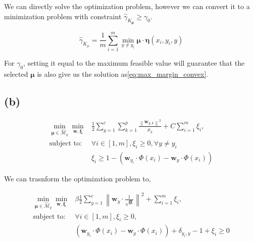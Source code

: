 \documentclass{article}
\begin{document}
We can directly solve the optimization problem, however we can convert it to a minimization problem with constraint $\widehat{\gamma}_{K_{\boldsymbol{\mu}}} \geq \gamma_{0}$.

\begin{equation}
    \widehat{\gamma}_{K_{\mu}}=\frac{1}{m} \sum_{i=1}^{m} \min _{y \neq y_{i}} \boldsymbol{\mu} \cdot \boldsymbol{\eta}\left(x_{i}, y_{i}, y\right)
\end{equation}

For $\gamma_0$, setting it equal to the maximum feasible value will guarantee that the selected $\bm{\mu}$ is also give us the solution as\eqref{eq:max_margin_convex}.

\subsection*{(b)}

\begin{equation}
    \begin{aligned}
        \min _{\boldsymbol{\mu} \in \widehat{\mathcal{M}}_{q}} \min _{\mathbf{w}, \boldsymbol{\xi}} & \frac{1}{2} \sum_{y=1}^{c} \sum_{k=1}^{p} \frac{\left\|\mathbf{w}_{y, k}\right\|^{2}}{\mu_{k}}+C \sum_{i=1}^{m} \xi_{i}, \\
        \text{subject to: }                                                                         & \forall i \in[1, m], \xi_{i} \geq 0, \forall y \neq y_{i}                                                                \\
                                                                                                    & \xi_{i} \geq 1-\left(\mathbf{w}_{y_{i}} \cdot \Phi\left(x_{i}\right)-\mathbf{w}_{y} \cdot \Phi\left(x_{i}\right)\right)
    \end{aligned}
\end{equation}

We can trasnform the optimization problem to,

\begin{equation}
    \begin{aligned}
        \min _{\boldsymbol{\mu} \in \widehat{\mathcal{M}}_{q}} \min _{\mathbf{w}, \boldsymbol{\xi}}
         & \beta  \frac{1}{2}  \sum_{y=1}^{c} \left\|\mathbf{w}_{y} \cdot \frac{1}{\sqrt{\bm{\mu}}}\right\|^{2}+\sum_{i=1}^{m} \xi_{i},                    \\
        \text{subject to: }
         & \forall i \in[1, m], \xi_{i} \geq 0,                                                                                                            \\
         & \left(\mathbf{w}_{y_{i}} \cdot \Phi\left(x_{i}\right)-\mathbf{w}_{y} \cdot \Phi\left(x_{i}\right)\right) + \delta_{y_i, y} - 1 + \xi_{i} \geq 0
    \end{aligned}
\end{equation}
\end{document}
